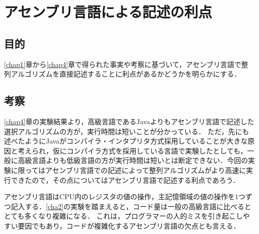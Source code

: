 \chapter{アセンブリ言語による記述の利点}
\section{目的}
\ref{chap1}章から\ref{chap4}章で得られた事実や考察に基づいて，アセンブリ言語で整列アルゴリズムを直接記述することに利点があるかどうかを明らかにする．
\section{考察}
\ref{chap4}章の実験結果より，高級言語である{\ttfamily Java}よりもアセンブリ言語で記述した選択アルゴリズムの方が，実行時間は短いことが分かっている．
ただ，先にも述べたように{\ttfamily Java}がコンパイラ・インタプリタ方式採用していることが大きな原因と考えられ，仮にコンパイラ方式を採用している言語で実験したとしても，一般に高級言語よりも低級言語の方が実行時間は短いとは断定できない．今回の実験に限ってはアセンブリ言語での記述によって整列アルゴリズムがより高速に実行できたので，その点についてはアセンブリ言語で記述する利点であろう．\par
アセンブリ言語はCPU内のレジスタの値の操作，主記憶領域の値の操作を1つずつ記入する．\ref{cha2}の実験を踏まえると，コード量は一般の高級言語に比べるととても多くなり複雑になる．
これは，プログラマーの人的ミスを引き起こしやすい要因でもあり，コードが複雑化するアセンブリ言語の欠点とも言える．